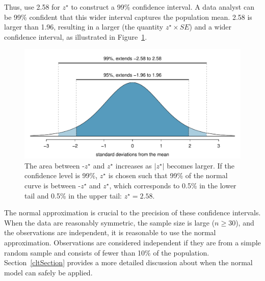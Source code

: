 \begin{spacing}{1.5}
Thus, use 2.58 for $z^{\star}$ to construct a 99\% confidence interval. A data analyst can be 99\% confident that this wider interval captures the population mean. 2.58 is larger than 1.96, resulting in a larger  (the quantity $z^{\star} \times SE$) and a wider confidence interval, as illustrated in Figure~\ref{choosingZForCI}.

\begin{figure}[h]
	\centering
	\includegraphics[width=\textwidth]
	{ch_inference_foundations_oi_biostat/figures/choosingZForCI/choosingZForCI}
	\caption{The area between -$z^{\star}$ and $z^{\star}$ increases as $|z^{\star}|$ becomes larger. If the confidence level is 99\%, $z^{\star}$ is chosen such that 99\% of the normal curve is between -$z^{\star}$ and $z^{\star}$, which corresponds to 0.5\% in the lower tail and 0.5\% in the upper tail: $z^{\star}=2.58$.}
	\label{choosingZForCI}
\end{figure}
 
The normal approximation is crucial to the precision of these confidence intervals. When the data are reasonably symmetric, the sample size is large ($n \geq 30$), and the observations are independent, it is reasonable to use the normal approximation. Observations are considered independent if they are from a simple random sample and consists of fewer than 10\% of the population. Section~\ref{cltSection} provides a more detailed discussion about when the normal model can safely be applied. 


\end{spacing}
